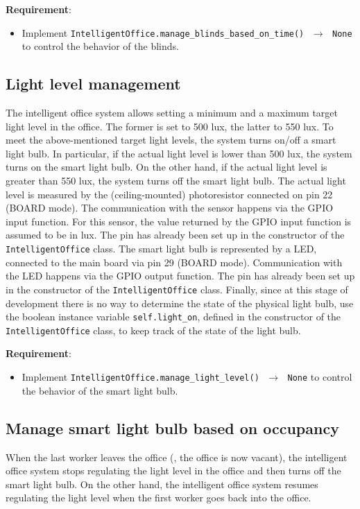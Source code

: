 \noindent\textbf{Requirement}:
\begin{itemize}
    \item Implement \texttt{IntelligentOffice.manage\_blinds\_based\_on\_time() $\,\to\,$ None} to control the behavior of the blinds.
\end{itemize}


\subsection{Light level management}
The intelligent office system allows setting a minimum and a maximum target light level in the office. The former is set to 500 lux, the latter to 550 lux. 
To meet the above-mentioned target light levels, the system turns on/off a smart light bulb. In particular, if the actual light level is lower than 500 lux, the system turns on the smart light bulb. On the other hand, if the actual light level is greater than 550 lux, the system turns off the smart light bulb. 
The actual light level is measured by the (ceiling-mounted) photoresistor connected on pin 22 (BOARD mode). The communication with the sensor happens via the GPIO input function. For this sensor, the value returned by the GPIO input function is assumed to be in lux. The pin has already been set up in the constructor of the \texttt{ IntelligentOffice} class. 
The smart light bulb is represented by a LED, connected to the main board via pin 29 (BOARD mode). Communication with the LED happens via the GPIO output function. The pin has already been set up in the constructor of  the \texttt{IntelligentOffice} class.
Finally, since at this stage of development there is no way to determine the state of the physical light bulb, use the boolean instance variable \texttt{self.light\_on}, defined in the constructor of the \texttt{IntelligentOffice} class, to keep track of the state of the light bulb.

\noindent\textbf{Requirement}:
\begin{itemize}
    \item Implement \texttt{IntelligentOffice.manage\_light\_level() $\,\to\,$ None} to control the behavior of the smart light bulb.
\end{itemize}


\subsection{Manage smart light bulb based on occupancy}
When the last worker leaves the office (\ie, the office is now vacant), the intelligent office system stops regulating the light level in the office and then turns off the smart light bulb. 
On the other hand, the intelligent office system resumes regulating the light level when the first worker goes back into the office. 

